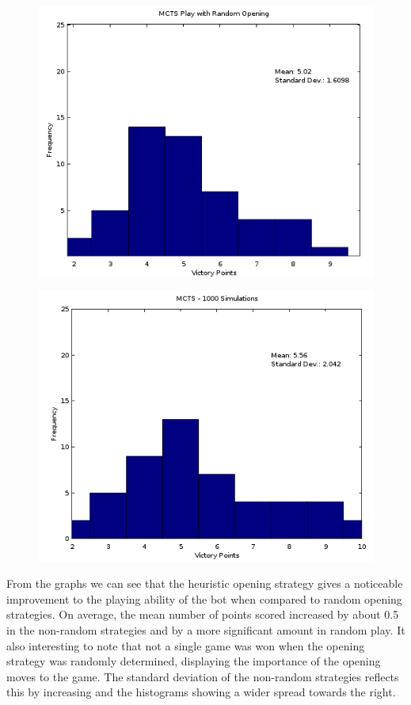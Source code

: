 \documentclass[]{article}
\begin{document}
\begin{figure}[H]
\centering
\begin{minipage}{.5\textwidth}
  \centering
  \includegraphics[width=.9\linewidth]{figures/roMCTS}
  \label{fig:opening5}
\end{minipage}%
\begin{minipage}{.5\textwidth}
  \centering
  \includegraphics[width=.9\linewidth]{figures/hoMCTS}
  \label{fig:opening6}
\end{minipage}
\end{figure}

\par From the graphs we can see that the heuristic opening strategy gives a noticeable improvement to the playing ability of the bot when compared to random opening strategies. On average, the mean number of points scored increased by about 0.5 in the non-random strategies and by a more significant amount in random play. It also interesting to note that not a single game was won when the opening strategy was randomly determined, displaying the importance of the opening moves to the game. The standard deviation of the non-random strategies reflects this by increasing and the histograms showing a wider spread towards the right. 
\end{document}
